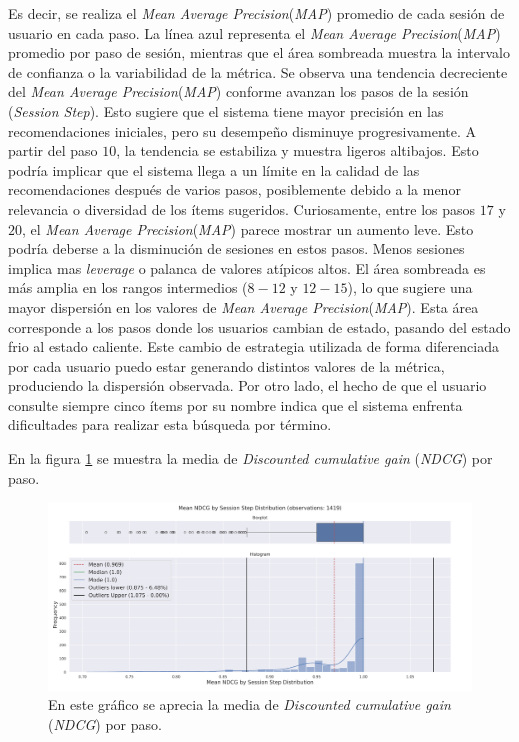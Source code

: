 \documentclass[11pt,a4paper,twoside]{thesis}
\begin{document}
Es decir, se realiza el \textit{Mean Average Precision}(\textit{MAP}) promedio de cada sesión de usuario en cada paso. La línea azul representa el \textit{Mean Average Precision}(\textit{MAP}) promedio por paso de sesión, mientras que el área sombreada muestra la intervalo de confianza o la variabilidad de la métrica. Se observa una tendencia decreciente del \textit{Mean Average Precision}(\textit{MAP}) conforme avanzan los pasos de la sesión (\textit{Session Step}). Esto sugiere que el sistema tiene mayor precisión en las recomendaciones iniciales, pero su desempeño disminuye progresivamente. A partir del paso $10$, la tendencia se estabiliza y muestra ligeros altibajos.
Esto podría implicar que el sistema llega a un límite en la calidad de las recomendaciones después de varios pasos, posiblemente debido a la menor relevancia o diversidad de los ítems sugeridos. Curiosamente, entre los pasos $17$ y $20$, el \textit{Mean Average Precision}(\textit{MAP}) parece mostrar un aumento leve. Esto podría deberse a la disminución de sesiones en estos pasos. Menos sesiones implica mas \textit{leverage} o palanca de valores atípicos altos. El área sombreada es más amplia en los rangos intermedios ($8-12$ y $12-15$), lo que sugiere una mayor dispersión en los valores de \textit{Mean Average Precision}(\textit{MAP}). Esta área corresponde a los pasos donde los usuarios cambian de estado, pasando del estado frio al estado caliente. Este cambio de estrategia utilizada de forma diferenciada por cada usuario puedo estar generando distintos valores de la métrica, produciendo la dispersión observada. Por otro lado, el hecho de que el usuario consulte siempre cinco ítems por su nombre indica que el sistema enfrenta dificultades para realizar esta búsqueda por término.

\clearpage

En la figura \ref{fig:llama2-mean_ndcg_by_session_step_distribution} se muestra la media de \textit{Discounted cumulative gain} (\textit{NDCG}) por paso.

\begin{figure}[htbp]
	\centering
	\includegraphics[width=15cm]{./images/llama2/mean_ndcg_by_session_step_distribution.png}
	\caption{En este gráfico se aprecia la media de \textit{Discounted cumulative gain} (\textit{NDCG}) por paso.}
	\label{fig:llama2-mean_ndcg_by_session_step_distribution}
\end{figure}
\end{document}
